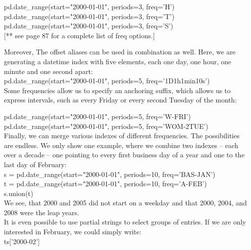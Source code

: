 \documentclass{article}
\numberwithin{equation}{section} %
\begin{document}
pd.date\_range(start="2000-01-01", periods=3, freq='H') \\

pd.date\_range(start="2000-01-01", periods=3, freq='T') \\

pd.date\_range(start="2000-01-01", periods=3, freq='S') \\

[** see page 87 for a complete list of freq options.]

Moreover, The offset aliases can be used in combination as well. Here, we are
generating a datetime index with five elements, each one day, one hour, one minute
and one second apart: \\

pd.date\_range(start="2000-01-01", periods=5, freq='1D1h1min10s') \\

Some frequencies allow us to specify an anchoring suffix, which allows us to express
intervals, such as every Friday or every second Tuesday of the month:

pd.date\_range(start="2000-01-01", periods=5, freq='W-FRI') \\

pd.date\_range(start="2000-01-01", periods=5, freq='WOM-2TUE') \\

Finally, we can merge various indexes of different frequencies. The possibilities
are endless. We only show one example, where we combine two indexes – each over
a decade – one pointing to every first business day of a year and one to the last day
of February: \\

s = pd.date\_range(start="2000-01-01", periods=10, freq='BAS-JAN') \\

t = pd.date\_range(start="2000-01-01", periods=10, freq='A-FEB') \\

s.union(t) \\

We see, that 2000 and 2005 did not start on a weekday and that 2000, 2004, and 2008
were the leap years. \\

It is even possible to use partial strings to select groups of entries. If we are only
interested in February, we could simply write: \\

ts['2000-02'] \\
\end{document}
